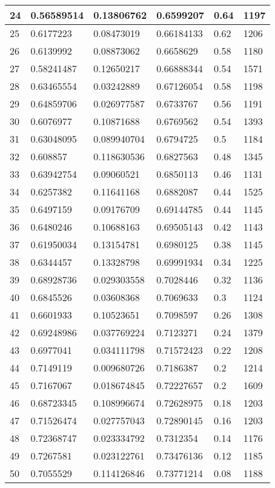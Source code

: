 \begin{longtable}{|l|l|l|l|l|l|}
24 & 0.56589514 & 0.13806762 & 0.6599207 & 0.64 & 1197 \\ \hline 
25 & 0.6177223 & 0.08473019 & 0.66184133 & 0.62 & 1206 \\ \hline 
26 & 0.6139992 & 0.08873062 & 0.6658629 & 0.58 & 1180 \\ \hline 
27 & 0.58241487 & 0.12650217 & 0.66888344 & 0.54 & 1571 \\ \hline 
28 & 0.63465554 & 0.03242889 & 0.67126054 & 0.58 & 1198 \\ \hline 
29 & 0.64859706 & 0.026977587 & 0.6733767 & 0.56 & 1191 \\ \hline 
30 & 0.6076977 & 0.10871688 & 0.6769562 & 0.54 & 1393 \\ \hline 
31 & 0.63048095 & 0.089940704 & 0.6794725 & 0.5 & 1184 \\ \hline 
32 & 0.608857 & 0.118630536 & 0.6827563 & 0.48 & 1345 \\ \hline 
33 & 0.63942754 & 0.09060521 & 0.6850113 & 0.46 & 1131 \\ \hline 
34 & 0.6257382 & 0.11641168 & 0.6882087 & 0.44 & 1525 \\ \hline 
35 & 0.6497159 & 0.09176709 & 0.69144785 & 0.44 & 1145 \\ \hline 
36 & 0.6480246 & 0.10688163 & 0.69505143 & 0.42 & 1143 \\ \hline 
37 & 0.61950034 & 0.13154781 & 0.6980125 & 0.38 & 1145 \\ \hline 
38 & 0.6344457 & 0.13328798 & 0.69991934 & 0.34 & 1225 \\ \hline 
39 & 0.68928736 & 0.029303558 & 0.7028446 & 0.32 & 1136 \\ \hline 
40 & 0.6845526 & 0.03608368 & 0.7069633 & 0.3 & 1124 \\ \hline 
41 & 0.6601933 & 0.10523651 & 0.7098597 & 0.26 & 1308 \\ \hline 
42 & 0.69248986 & 0.037769224 & 0.7123271 & 0.24 & 1379 \\ \hline 
43 & 0.6977041 & 0.034111798 & 0.71572423 & 0.22 & 1208 \\ \hline 
44 & 0.7149119 & 0.009680726 & 0.7186387 & 0.2 & 1214 \\ \hline 
45 & 0.7167067 & 0.018674845 & 0.72227657 & 0.2 & 1609 \\ \hline 
46 & 0.68723345 & 0.108996674 & 0.72628975 & 0.18 & 1203 \\ \hline 
47 & 0.71526474 & 0.027757043 & 0.72890145 & 0.16 & 1203 \\ \hline 
48 & 0.72368747 & 0.023334792 & 0.7312354 & 0.14 & 1176 \\ \hline 
49 & 0.7267581 & 0.023122761 & 0.73476136 & 0.12 & 1185 \\ \hline 
50 & 0.7055529 & 0.114126846 & 0.73771214 & 0.08 & 1188 \\ \hline 
\end{longtable}